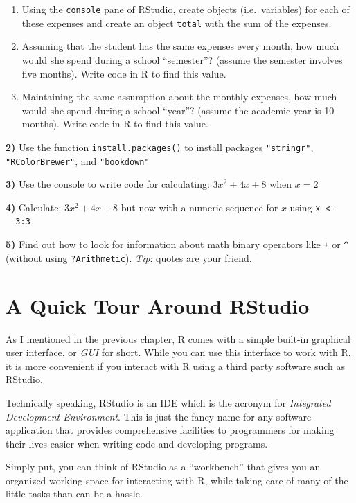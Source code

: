 \documentclass[
]{book}
\begin{document}
\begin{enumerate}
\def\labelenumi{\alph{enumi})}
\item
  Using the \texttt{console} pane of RStudio, create objects (i.e.~variables) for each
  of these expenses and create an object \texttt{total} with the sum of the expenses.
\item
  Assuming that the student has the same expenses every month, how much would
  she spend during a school ``semester''? (assume the semester involves five months).
  Write code in R to find this value.
\item
  Maintaining the same assumption about the monthly expenses, how much would she
  spend during a school ``year''? (assume the academic year is 10 months).
  Write code in R to find this value.
\end{enumerate}

\textbf{2)} Use the function \texttt{install.packages()} to install packages \texttt{"stringr"},
\texttt{"RColorBrewer"}, and \texttt{"bookdown"}

\textbf{3)} Use the console to write code for calculating: \(3x^2 + 4x + 8\) when \(x = 2\)

\textbf{4)} Calculate: \(3x^2 + 4x + 8\) but now with a numeric sequence for \(x\)
using \texttt{x\ \textless{}-\ -3:3}

\textbf{5)} Find out how to look for information about math binary operators
like \texttt{+} or \texttt{\^{}} (without using \texttt{?Arithmetic}). \emph{Tip}: quotes are your friend.

\hypertarget{rstudio}{%
\chapter{A Quick Tour Around RStudio}\label{rstudio}}

As I mentioned in the previous chapter, R comes with a simple built-in graphical
user interface, or \emph{GUI} for short. While you can use this interface to
work with R, it is more convenient if you interact with R using a third party
software such as RStudio.

Technically speaking, RStudio is an IDE which is the acronym for
\emph{Integrated Development Environment}. This is just the fancy name for any
software application that provides comprehensive facilities to programmers for
making their lives easier when writing code and developing programs.

Simply put, you can think of RStudio as a ``workbench'' that gives you an
organized working space for interacting with R, while taking care of many of
the little tasks than can be a hassle.
\end{document}
